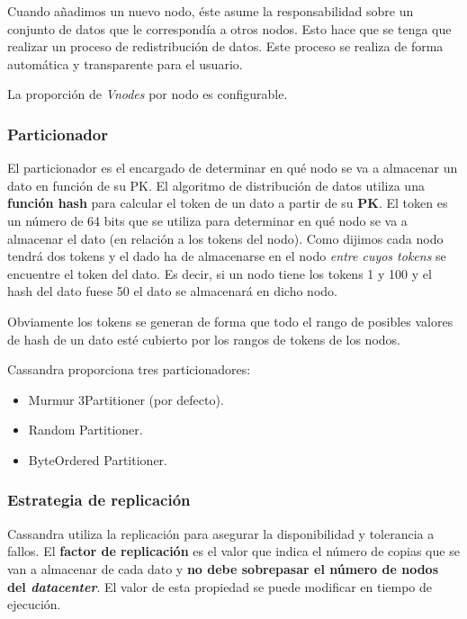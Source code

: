 \documentclass[
]{book}
\providecommand{\tightlist}{%
  \setlength{\itemsep}{0pt}\setlength{\parskip}{0pt}}
\begin{document}
Cuando añadimos un nuevo nodo, éste asume la responsabilidad sobre un conjunto de datos que le correspondía a otros nodos. Esto hace que se tenga que realizar un proceso de redistribución de datos. Este proceso se realiza de forma automática y transparente para el usuario.

La proporción de \emph{Vnodes} por nodo es configurable.

\subsubsection{Particionador}\label{particionador}

El particionador es el encargado de determinar en qué nodo se va a almacenar un dato en función de su PK. El algoritmo de distribución de datos utiliza una \textbf{función hash} para calcular el token de un dato a partir de su \textbf{PK}. El token es un número de 64 bits que se utiliza para determinar en qué nodo se va a almacenar el dato (en relación a los tokens del nodo). Como dijimos cada nodo tendrá dos tokens y el dado ha de almacenarse en el nodo \emph{entre cuyos tokens} se encuentre el token del dato. Es decir, si un nodo tiene los tokens 1 y 100 y el hash del dato fuese 50 el dato se almacenará en dicho nodo.

Obviamente los tokens se generan de forma que todo el rango de posibles valores de hash de un dato esté cubierto por los rangos de tokens de los nodos.

Cassandra proporciona tres particionadores:

\begin{itemize}
\tightlist
\item
  Murmur 3Partitioner (por defecto).
\item
  Random Partitioner.
\item
  ByteOrdered Partitioner.
\end{itemize}

\subsubsection{Estrategia de replicación}\label{estrategia-de-replicaciuxf3n}

Cassandra utiliza la replicación para asegurar la disponibilidad y tolerancia a fallos. El \textbf{factor de replicación} es el valor que indica el número de copias que se van a almacenar de cada dato y \textbf{no debe sobrepasar el número de nodos del \emph{datacenter}}. El valor de esta propiedad se puede modificar en tiempo de ejecución.
\end{document}
